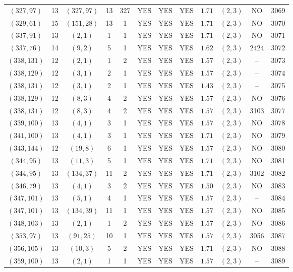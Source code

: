 \begin{longtable}{|c|c|c|c|c|c|c|c|c|c|c|c|}
$(327,97)$ & 13 & $(327,97)$ & 13 & 327 & YES & YES & YES & $1.71$ & $(2,3)$ & NO & 3069\\
$(329,61)$ & 15 & $(151,28)$ & 13 & 1 & YES & YES & YES & $1.71$ & $(2,3)$ & NO & 3070\\
$(337,91)$ & 13 & $(2,1)$ & 1 & 1 & YES & YES & YES & $1.71$ & $(2,3)$ & NO & 3071\\
$(337,76)$ & 14 & $(9,2)$ & 5 & 1 & YES & YES & YES & $1.62$ & $(2,3)$ & 2424 & 3072\\
$(338,131)$ & 12 & $(2,1)$ & 1 & 2 & YES & YES & YES & $1.57$ & $(2,3)$ & -- & 3073\\
$(338,129)$ & 12 & $(3,1)$ & 2 & 1 & YES & YES & YES & $1.57$ & $(2,3)$ & -- & 3074\\
$(338,131)$ & 12 & $(3,1)$ & 2 & 1 & YES & YES & YES & $1.43$ & $(2,3)$ & -- & 3075\\
$(338,129)$ & 12 & $(8,3)$ & 4 & 2 & YES & YES & YES & $1.57$ & $(2,3)$ & NO & 3076\\
$(338,131)$ & 12 & $(8,3)$ & 4 & 2 & YES & YES & YES & $1.57$ & $(2,3)$ & 3103 & 3077\\
$(339,100)$ & 13 & $(4,1)$ & 3 & 1 & YES & YES & YES & $1.57$ & $(2,3)$ & NO & 3078\\
$(341,100)$ & 13 & $(4,1)$ & 3 & 1 & YES & YES & YES & $1.71$ & $(2,3)$ & NO & 3079\\
$(343,144)$ & 12 & $(19,8)$ & 6 & 1 & YES & YES & YES & $1.57$ & $(2,3)$ & NO & 3080\\
$(344,95)$ & 13 & $(11,3)$ & 5 & 1 & YES & YES & YES & $1.71$ & $(2,3)$ & NO & 3081\\
$(344,95)$ & 13 & $(134,37)$ & 11 & 2 & YES & YES & YES & $1.71$ & $(2,3)$ & 3102 & 3082\\
$(346,79)$ & 13 & $(4,1)$ & 3 & 2 & YES & YES & YES & $1.50$ & $(2,3)$ & NO & 3083\\
$(347,101)$ & 13 & $(5,1)$ & 4 & 1 & YES & YES & YES & $1.57$ & $(2,3)$ & -- & 3084\\
$(347,101)$ & 13 & $(134,39)$ & 11 & 1 & YES & YES & YES & $1.57$ & $(2,3)$ & NO & 3085\\
$(348,103)$ & 13 & $(2,1)$ & 1 & 2 & YES & YES & YES & $1.57$ & $(2,3)$ & NO & 3086\\
$(353,97)$ & 13 & $(91,25)$ & 10 & 1 & YES & YES & YES & $1.57$ & $(2,3)$ & 3056 & 3087\\
$(356,105)$ & 13 & $(10,3)$ & 5 & 2 & YES & YES & YES & $1.71$ & $(2,3)$ & NO & 3088\\
$(359,100)$ & 13 & $(2,1)$ & 1 & 1 & YES & YES & YES & $1.57$ & $(2,3)$ & -- & 3089\\

\end{longtable}
